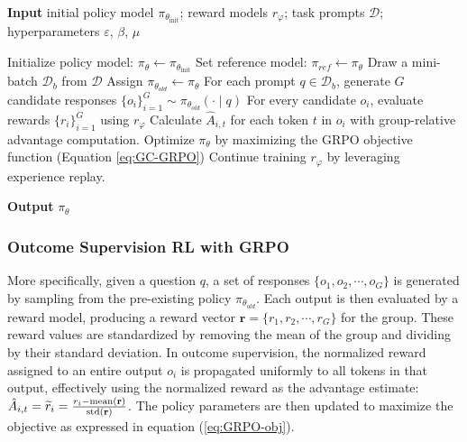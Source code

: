 \begin{itemize}[topsep=0pt]
\begin{itemize}[topsep=0pt]
\begin{algorithm}[t]
  \small
  \caption{Iterative Group Relative Policy Optimization}
  \textbf{Input} initial policy model $\pi_{\theta_{\text{init}}}$; reward models $r_\varphi$; task prompts $\mathcal{D}$; 
  hyperparameters $\varepsilon$, $\beta$, $\mu$
  \begin{algorithmic}[1]
    \State Initialize policy model: $\pi_\theta \leftarrow \pi_{\theta_{\text{init}}}$
       \State Set reference model: $\pi_{ref} \leftarrow \pi_{\theta}$
      \State Draw a mini-batch $\mathcal{D}_b$ from $\mathcal{D}$
      \State Assign $\pi_{\theta_{old}} \leftarrow \pi_{\theta}$ 
      \State For each prompt $q \in \mathcal{D}_b$, generate $G$ candidate responses $\{o_i\}_{i=1}^G \sim \pi_{\theta_{old}} (\cdot \mid q) $
      \State For every candidate $o_i$, evaluate rewards $\{r_i\}_{i=1}^{G}$ using $r_{\varphi}$ 
      \State Calculate $\hat{A}_{i,t}$ for each token $t$ in $o_i$ with group-relative advantage computation.
        \State Optimize $\pi_{\theta}$ by maximizing the GRPO objective function (Equation \ref{eq:GC-GRPO})
      \EndFor
    \EndFor \State Continue training $r_\varphi$ by leveraging experience replay.
    \EndFor 
  \end{algorithmic}
  \textbf{Output} $\pi_\theta$
  \label{alg:iter-grpo}
\end{algorithm}

\subsubsection{Outcome Supervision RL with GRPO} More specifically, given a question $q$, a set of responses $\{o_1, o_2, \cdots, o_G\}$ is generated by sampling from the pre-existing policy $\pi_{\theta_{old}}$. Each output is then evaluated by a reward model, producing a reward vector $\mathbf{r} = \{r_1, r_2, \cdots, r_G\}$ for the group. These reward values are standardized by removing the mean of the group and dividing by their standard deviation. In outcome supervision, the normalized reward assigned to an entire output $o_i$ is propagated uniformly to all tokens in that output, effectively using the normalized reward as the advantage estimate: $\hat{A}_{i, t} = \widetilde{r}_i = \frac{r_i- {\rm mean}(\mathbf{r})}{{\rm std}(\mathbf{r})}$. The policy parameters are then updated to maximize the objective as expressed in equation (\ref{eq:GRPO-obj}).


\end{itemize}
\end{itemize}
